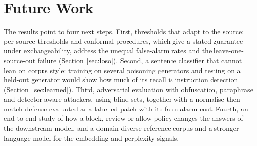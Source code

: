 \section{Future Work}
\label{sec:future}
The results point to four next steps. First, thresholds that adapt to the source:
per-source thresholds and conformal procedures, which give a stated guarantee
under exchangeability, address the unequal false-alarm rates and the
leave-one-source-out failure (Section~\ref{sec:loso}). Second, a sentence
classifier that cannot lean on corpus style: training on several poisoning
generators and testing on a held-out generator would show how much of its recall
is instruction detection (Section~\ref{sec:learned}). Third, adversarial
evaluation with obfuscation, paraphrase and detector-aware attackers, using blind
sets, together with a normalise-then-match defence evaluated as a labelled patch
with its false-alarm cost. Fourth, an end-to-end study of how a block, review or
allow policy changes the answers of the downstream model, and a domain-diverse
reference corpus and a stronger language model for the embedding and perplexity
signals.